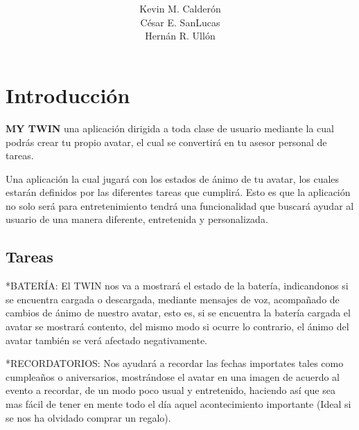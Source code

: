 \documentclass[12pt]{article}
\title{{\LARGE \textbf{\color{blue}{MY TWIN}}}}
\author{Kevin M. Calder\'on\\C\'esar E. SanLucas\\Hern\'an R. Ull\'on}
\date{}
\begin{document}
\maketitle


\newpage
\section{Introducci\'on} 

\textbf{MY TWIN} una aplicaci\'on dirigida a toda clase de usuario mediante la cual podr\'as crear tu propio avatar, el cual se convertir\'a en tu asesor personal de tareas. 

Una aplicaci\'on la cual jugar\'a con los estados de \'animo de tu avatar, los cuales estar\'an definidos por las diferentes tareas que cumplir\'a. Esto es que la aplicaci\'on no solo ser\'a para entretenimiento tendr\'a una funcionalidad que buscar\'a ayudar al usuario de una manera diferente, entretenida y personalizada.\\
\subsection{Tareas} 

\hspace{0.2in}*BATER\'IA: El TWIN  nos va a mostrar\'a el estado de la bater\'ia, indicandonos si se encuentra cargada o descargada, mediante mensajes de voz, acompa\~nado de cambios de \'animo de nuestro avatar, esto es, si se encuentra la bater\'ia cargada el avatar se mostrar\'a contento, del mismo modo si ocurre lo contrario, el \'animo del avatar tambi\'en se ver\'a afectado negativamente. 

\hspace{0.2in}*RECORDATORIOS: Nos ayudar\'a a recordar las fechas importates tales como cumplea\~nos o aniversarios, mostr\'andose el avatar en una imagen de acuerdo al evento a recordar, de un modo poco usual y entretenido, haciendo as\'i que sea mas f\'acil de tener en mente todo el d\'ia aquel acontecimiento importante (Ideal si se nos ha olvidado comprar un regalo).
\end{document}
